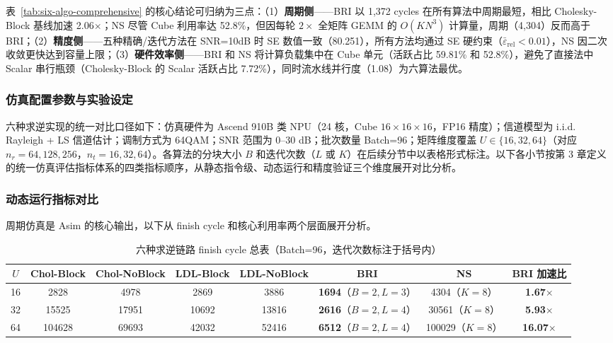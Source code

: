 \documentclass{CjC}
\begin{document}
表~\ref{tab:six-algo-comprehensive} 的核心结论可归纳为三点：（1）\textbf{周期侧}——BRI 以 1,372 cycles 在所有算法中周期最短，相比 Cholesky-Block 基线加速 2.06$\times$；NS 尽管 Cube 利用率达 52.8\%，但因每轮 $2\times$ 全矩阵 GEMM 的 $O(KN^{3})$ 计算量，周期（4,304）反而高于 BRI；（2）\textbf{精度侧}——五种精确/迭代方法在 SNR=10dB 时 SE 数值一致（80.251），所有方法均通过 SE 硬约束（$\bar{\varepsilon}_{\text{rel}}<0.01$），NS 因二次收敛更快达到容量上限；（3）\textbf{硬件效率侧}——BRI 和 NS 将计算负载集中在 Cube 单元（活跃占比 59.81\% 和 52.8\%），避免了直接法中 Scalar 串行瓶颈（Cholesky-Block 的 Scalar 活跃占比 7.72\%），同时流水线并行度（1.08）为六算法最优。

\subsubsection{仿真配置参数与实验设定}

六种求逆实现的统一对比口径如下：仿真硬件为 Ascend 910B 类 NPU（24 核，Cube $16\times16\times16$，FP16 精度）；信道模型为 i.i.d. Rayleigh + LS 信道估计；调制方式为 64QAM；SNR 范围为 0--30 dB；批次数量 Batch=96；矩阵维度覆盖 $U\in\{16,32,64\}$（对应 $n_r=64,128,256$，$n_t=16,32,64$）。各算法的分块大小 $B$ 和迭代次数（$L$ 或 $K$）在后续分节中以表格形式标注。以下各小节按第 3 章定义的统一仿真评估指标体系的四类指标顺序，从静态指令级、动态运行和精度验证三个维度展开对比分析。

\subsubsection{动态运行指标对比}

周期仿真是 Asim 的核心输出，以下从 finish cycle 和核心利用率两个层面展开分析。

    \begin{table}[H]
        \centering
        \caption{六种求逆链路 finish cycle 总表（Batch=96，迭代次数标注于括号内）}
        \label{tab:five-cycle}
        \begin{tabular}{c|cccccc|c}
            \toprule $U$ & Chol-Block & Chol-NoBlock & LDL-Block & LDL-NoBlock & \textbf{BRI}                 & NS              & BRI 加速比                \\
            \midrule 16  & 2828       & 4978         & 2869      & 3886        & \textbf{1694}（$B{=}2,L{=}3$） & 4304（$K{=}8$）   & \textbf{1.67$\times$}  \\
            32           & 15525      & 17951        & 10692     & 13816       & \textbf{2616}（$B{=}2,L{=}4$） & 30561（$K{=}8$）  & \textbf{5.93$\times$}  \\
            64           & 104628     & 69693        & 42032     & 52416       & \textbf{6512}（$B{=}2,L{=}4$） & 100029（$K{=}8$） & \textbf{16.07$\times$} \\
            \bottomrule
        \end{tabular}
    \end{table}
\end{document}

